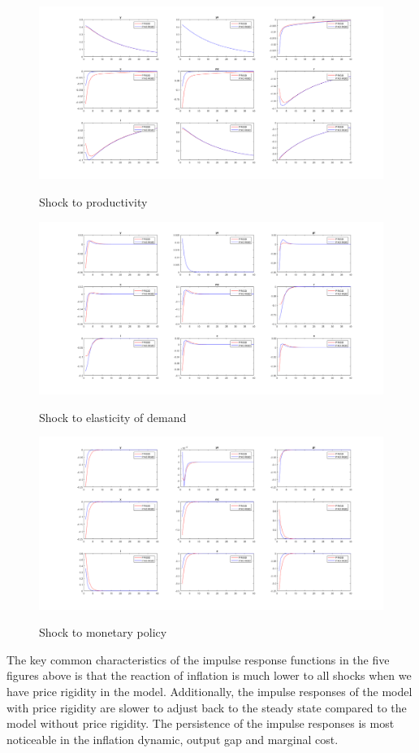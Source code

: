 \documentclass[10pt,a4paper]{article}
\begin{document}
\begin{figure}[H]
	\centering
   \includegraphics[scale=0.35]{./screenshots/shock_to_productivity.png}
   \label{Figure 3:}
   \caption{Shock to productivity}
\end{figure}
\begin{figure}[H]
   \centering
   \includegraphics[scale=0.35]{./screenshots/shock_to_elasticity_of_demand.png}
   \label{Figure 4:}
   \caption{Shock to elasticity of demand}
\end{figure}
\begin{figure}[H]
	\centering
   \includegraphics[scale=0.35]{./screenshots/shock_to_monetary_policy.png}
   \label{Figure 5:}
   \caption{Shock to monetary policy}
\end{figure}

The key common characteristics of the impulse response functions in the five figures above is that the reaction of inflation is much lower to all shocks when we have price rigidity in the model. Additionally, the impulse responses of the model with price rigidity are slower to adjust back to the steady state compared to the model without price rigidity. The persistence of the impulse responses is most noticeable in the inflation dynamic, output gap and marginal cost.
\end{document}
